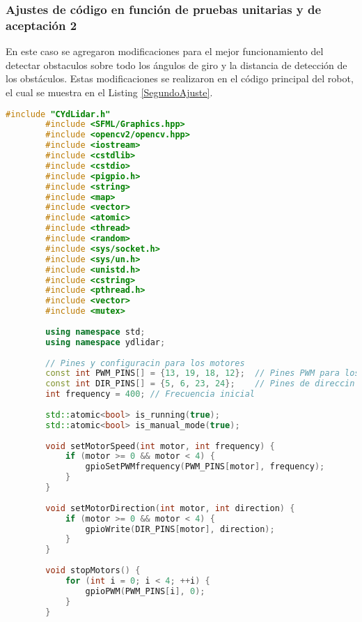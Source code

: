 \subsubsection{Ajustes de c\'odigo en funci\'on de pruebas unitarias y de aceptaci\'on 2} %
\label{ssub:Ajustes de c\'odigo en funci\'on de pruebas unitarias y de aceptaci\'on}
    En este caso se agregaron modificaciones para el mejor funcionamiento del detectar obstaculos
    sobre todo los \'angulos de giro y la distancia de detecci\'on de los obst\'aculos. Estas modificaciones
    se realizaron en el c\'odigo principal del robot, el cual se muestra en el Listing \ref{SegundoAjuste}.
    \begin{lstlisting}[language={C++}, caption={Segundo ajuste de c\'odigo}, label={SegundoAjuste}]
        #include "CYdLidar.h"
        #include <SFML/Graphics.hpp>
        #include <opencv2/opencv.hpp>
        #include <iostream>
        #include <cstdlib>
        #include <cstdio>
        #include <pigpio.h>
        #include <string>
        #include <map>
        #include <vector>
        #include <atomic>
        #include <thread>
        #include <random>
        #include <sys/socket.h>
        #include <sys/un.h>
        #include <unistd.h>
        #include <cstring>
        #include <pthread.h>
        #include <vector>
        #include <mutex>
        
        using namespace std;
        using namespace ydlidar;
        
        // Pines y configuracin para los motores
        const int PWM_PINS[] = {13, 19, 18, 12};  // Pines PWM para los motores
        const int DIR_PINS[] = {5, 6, 23, 24};    // Pines de direccin para los motores
        int frequency = 400; // Frecuencia inicial
        
        std::atomic<bool> is_running(true);
        std::atomic<bool> is_manual_mode(true);
        
        void setMotorSpeed(int motor, int frequency) {
            if (motor >= 0 && motor < 4) {
                gpioSetPWMfrequency(PWM_PINS[motor], frequency);
            }
        }
        
        void setMotorDirection(int motor, int direction) {
            if (motor >= 0 && motor < 4) {
                gpioWrite(DIR_PINS[motor], direction);
            }
        }
        
        void stopMotors() {
            for (int i = 0; i < 4; ++i) {
                gpioPWM(PWM_PINS[i], 0);
            }
        }
        

\end{lstlisting}
